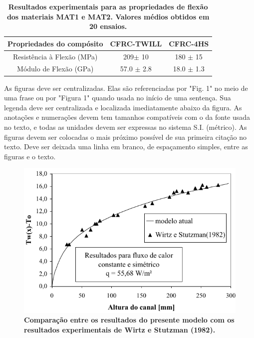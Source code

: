 \documentclass[10pt,fleqn,a4paper]{article}
\begin{document}
        \begin{table}[ht]
            \begin{center}
                \caption{\textbf{Resultados experimentais para as propriedades de flexão dos materiais MAT1 e MAT2. Valores médios obtidos em 20 ensaios.}}
                    \begin{tabular}{|c|c|c|}
                    \hline
                    Propriedades do compósito       & CFRC-TWILL        & CFRC-4HS         \\
                    \hline
                    Resistência à Flexão  (MPa)     & 209$\pm$ 10       & 180 $\pm$  15    \\
                    \hline
                    Módulo de Flexão  (GPa)         & 57.0 $\pm$ 2.8    & 18.0 $\pm$  1.3  \\
                    \hline
                    \end{tabular}
            \end{center}
        \end{table}

        As figuras deve ser centralizadas. Elas são referenciadas por "Fig. 1" no meio de uma frase ou por "Figura 1" quando usada no início de uma sentença. Sua legenda deve ser centralizada e localizada imediatamente abaixo da figura. As anotações e numerações devem tem tamanhos compatíveis com o da fonte usada no texto, e todas as unidades devem ser expressas no sistema S.I. (métrico). As figuras devem ser colocadas o mais próximo possível de sua primeira citação no texto. Deve ser deixada uma linha em branco, de espaçamento simples, entre as figuras e o texto.
    
        \begin{figure}[h]
            \begin{center}
                \includegraphics[angle=0, scale=.8]{figura.pdf}
            \end{center}
            \caption{\textbf{Comparação entre os resultados do presente modelo com os resultados experimentais de Wirtz e Stutzman (1982).}}
        \end{figure}
\end{document}
